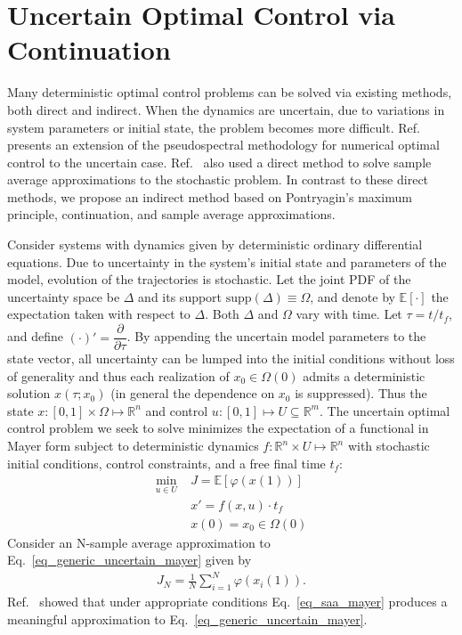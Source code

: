 \documentclass[10pt,a4paper]{article}
\begin{document}
	\section{Uncertain Optimal Control via Continuation}
	
	Many deterministic optimal control problems can be solved via existing methods, both direct and indirect. When the dynamics are uncertain, due to variations in system parameters or initial state, the problem becomes more difficult. Ref.~\cite{RSOptimalControl} presents an extension of the pseudospectral methodology for numerical optimal control to the uncertain case. Ref.~\cite{UncertainOptimalControl} also used a direct method to solve sample average approximations to the stochastic problem. In contrast to these direct methods, we propose an indirect method based on Pontryagin's maximum principle, continuation, and sample average approximations. 
	
	Consider systems with dynamics given by deterministic ordinary differential equations. Due to uncertainty in the system's initial state and parameters of the model, evolution of the trajectories is stochastic. Let the joint PDF of the uncertainty space be $ \Delta $ and its support $\mathrm{supp}(\Delta)\equiv\Omega$, and denote by $\mathbb{E}[\cdot]$ the expectation taken with respect to $\Delta$. Both $\Delta$ and $\Omega$ vary with time. Let $\tau=t/t_f$, and define $(\cdot)'=\dfrac{\partial}{\partial\tau}$. By appending the uncertain model parameters to the state vector, all uncertainty can be lumped into the initial conditions without loss of generality and thus each realization of $x_0\in\Omega(0)$ admits a deterministic solution $ x(\tau;x_0)$ (in general the dependence on $ x_0 $ is suppressed). Thus the state $x: [0,1]\times\Omega\mapsto\mathbb{R}^n$ and control $u: [0,1]\mapsto U\subseteq\mathbb{R}^m$. The uncertain optimal control problem we seek to solve minimizes the expectation of a functional in Mayer form subject to deterministic dynamics $f: \mathbb{R}^n \times U \mapsto \mathbb{R}^n$ with stochastic initial conditions, control constraints, and a free final time $t_f$:
	\begin{align}
	\min_{u\in U} \;&J = \mathbb{E}[\varphi(x(1))] \label{eq_generic_uncertain_mayer}  \\
		&x' = f(x,u)\cdot t_f \\
		&x(0)= x_0 \in \Omega(0) %
	\end{align}	
	Consider an N-sample average approximation to Eq.~\ref{eq_generic_uncertain_mayer} given by		
	\begin{align}
	J_N = \frac{1}{N}\sum_{i=1}^{N}\varphi(x_i(1)). \label{eq_saa_mayer}
	\end{align}	
	Ref.~\cite{UncertainOptimalControl} showed that under appropriate conditions Eq.~\ref{eq_saa_mayer} produces a meaningful approximation to Eq.~\ref{eq_generic_uncertain_mayer}. 
	
\end{document}

